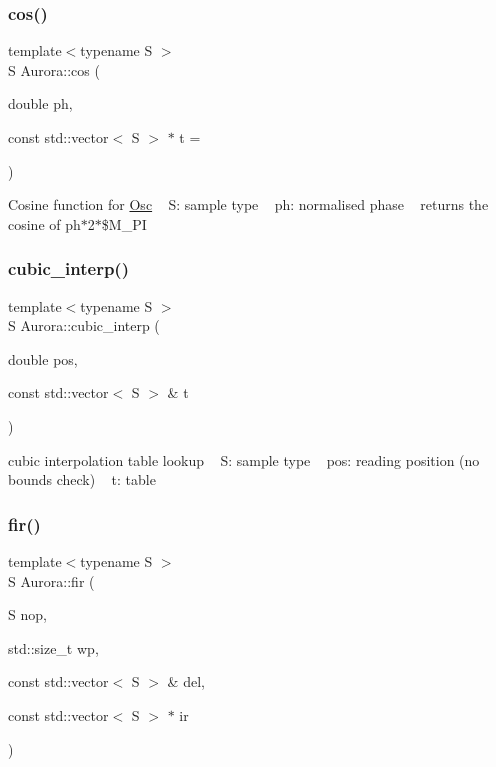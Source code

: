\subsubsection{\texorpdfstring{cos()}{cos()}}
{\footnotesize\ttfamily template$<$typename S $>$ \\
S Aurora\+::cos (\begin{DoxyParamCaption}\item[{double}]{ph,  }\item[{const std\+::vector$<$ S $>$ $\ast$}]{t = {} }\end{DoxyParamCaption})\hspace{0.3cm}{\ttfamily [inline]}}

Cosine function for \hyperlink{class_aurora_1_1_osc}{Osc} ~\newline
S\+: sample type ~\newline
ph\+: normalised phase ~\newline
returns the cosine of ph$\ast$2$\ast$\$\+M\+\_\+\+PI \mbox{\label{namespace_aurora_a35b9cf383290bddedd82b7c3d0f05e81}} 
\subsubsection{\texorpdfstring{cubic\+\_\+interp()}{cubic\_interp()}}
{\footnotesize\ttfamily template$<$typename S $>$ \\
S Aurora\+::cubic\+\_\+interp (\begin{DoxyParamCaption}\item[{double}]{pos,  }\item[{const std\+::vector$<$ S $>$ \&}]{t }\end{DoxyParamCaption})\hspace{0.3cm}{\ttfamily [inline]}}

cubic interpolation table lookup ~\newline
S\+: sample type ~\newline
pos\+: reading position (no bounds check) ~\newline
t\+: table \mbox{\label{namespace_aurora_aa192a550af8daa02ad2ee172339ba0d9}} 
\subsubsection{\texorpdfstring{fir()}{fir()}}
{\footnotesize\ttfamily template$<$typename S $>$ \\
S Aurora\+::fir (\begin{DoxyParamCaption}\item[{S}]{nop,  }\item[{std\+::size\+\_\+t}]{wp,  }\item[{const std\+::vector$<$ S $>$ \&}]{del,  }\item[{const std\+::vector$<$ S $>$ $\ast$}]{ir }\end{DoxyParamCaption})\hspace{0.3cm}{\ttfamily [inline]}}

